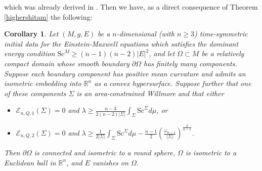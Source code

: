 \documentclass[12pt,a4paper]{amsart}
\theoremstyle{plain}
\newtheorem{corollary}[theorem]{Corollary}
\theoremstyle{definition}
\begin{document}
 which was already derived in \cite{pacheco2023constructing}. Then we have, as a direct consequence of Theorem \ref{highershitam} the following:
 \begin{corollary}
    Let $(M,g,E)$ be a $n$-dimensional (with $n\geq 3$) time-symmetric initial data for the Einstein-Maxwell equations  which satisfies the dominant energy condition $ \mathrm{Sc}^M \geq (n-1)(n-2) |E|^2$,  and let  $\Omega \subset M$ be a relatively compact domain whose smooth boundary  $\partial \Omega $  has finitely many components. Suppose each boundary component has positive mean curvature and admits an isometric embedding into \(\mathbb{R}^n\) as a convex hypersurface. Suppose further that one of these components $\Sigma$ is an area-constrained Willmore and that either
    \begin{itemize}
    \item[$i)$]  $\mathcal{E}_{n,Q,1}(\Sigma)=0$ and  $
        \lambda  \geq  \frac{n-3}{2(n-2)|\Sigma|}  
  \int_{\Sigma} 
 \mathrm{Sc}^{\Sigma} d\mu$, or
    \item[$ii)$]  $\mathcal{E}_{n,Q,2}(\Sigma)= 0$ and   $
     \lambda  \geq  \frac{1}{2|\Sigma|}\int_{\Sigma} 
 \mathrm{Sc}^{\Sigma} d\mu  -\frac{n-1}{2} \left( \frac{\omega_{n-1}}{ |\Sigma|} \right)^{\frac{2}{n-1}}$.
\end{itemize}
Then  $\partial \Omega$ is connected and isometric to a round sphere, $\Omega$ is isometric to a Euclidean ball in $\mathbb{R}^n$, and $ E$ vanishes  on $\Omega$.  
 \end{corollary}
\end{document}
